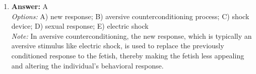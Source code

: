 \documentclass[12pt]{article}
\begin{document}
\begin{enumerate}[label=\arabic*.]
\\ \textit{Note:} The correct answer is supported by social psychology research indicating that providing information that contradicts stereotypes, facilitating interactions between individuals of equal status, and promoting interdependence among groups can effectively reduce prejudice by challenging existing beliefs and fostering positive relationships.
\item \textbf{Answer:} A
\\ \textit{Options:} A) new response; B) aversive counterconditioning process; C) shock device; D) sexual response; E) electric shock
\\ \textit{Note:} In aversive counterconditioning, the new response, which is typically an aversive stimulus like electric shock, is used to replace the previously conditioned response to the fetish, thereby making the fetish less appealing and altering the individual's behavioral response.
\end{enumerate}
\end{document}
